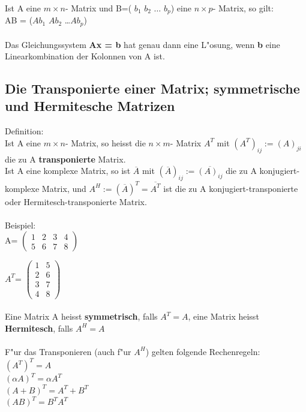 \documentclass[10pt, a4paper, twocolumn]{scrartcl}
\begin{document}
Ist A eine $m \times n$- Matrix und B=( $b_1$ $b_2$ $\ldots$ $b_p$) eine $n \times p$- Matrix, so gilt:\\
AB = ($Ab_1$ $Ab_2$ \ldots $Ab_p$)\\\\

Das Gleichungssystem {\bf Ax = b} hat genau dann eine L"osung, wenn {\bf b} eine Linearkombination der Kolonnen von A ist.\\

\subsection{Die Transponierte einer Matrix; symmetrische und Hermitesche Matrizen}

Definition:\\
Ist A eine $m\times n$- Matrix, so heisst die $n \times m$- Matrix $A^T$ mit $(A^T)_{ij}:=(A)_{ji}$ die zu A {\bf transponierte} Matrix.\\
Ist A eine komplexe Matrix, so ist $\overline{A}$ mit $(\overline{A})_{ij}:=\overline{(A)_{ij}}$ die zu A konjugiert-komplexe Matrix, und $A^H:=(\overline{A})^T=\overline{A^T}$ ist die zu A konjugiert-transponierte oder Hermitesch-transponierte Matrix.\\\\

Beispiel:\\

A=
$
\left (
\begin{array}{cccc}
1 & 2 & 3 & 4\\
5 & 6 & 7 & 8 
\end{array}
\right )
$

$A^T$=
$
\left (
\begin{array}{cc}
1 & 5\\
2 & 6\\
3 & 7\\
4 & 8
\end{array}
\right )
$\\\\

Eine Matrix A heisst {\bf symmetrisch}, falls $A^T=A$, eine Matrix heisst {\bf Hermitesch}, falls $A^H=A$\\\\

F"ur das Transponieren (auch f"ur $A^H$) gelten folgende Rechenregeln:\\
$(A^T)^T=A$\\
$(\alpha A)^T=\alpha A^T$\\
$(A+B)^T=A^T+B^T$\\
$(AB)^T=B^TA^T$\\\\
\end{document}
